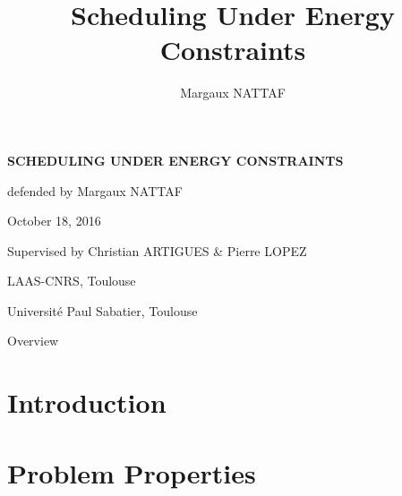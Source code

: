 \documentclass{beamer}
\title{Scheduling Under Energy Constraints}
\author{Margaux NATTAF}
\institute{LAAS-CNRS Toulouse

  Université Paul Sabatier Toulouse}
\begin{document}
{\canvasspecial
  \begin{frame}
    \vspace{1.5cm}
    \begin{flushleft}
      {\Large \bf \color{bleuLAAS}SCHEDULING UNDER ENERGY CONSTRAINTS}
      
      \vspace{0.3cm}
      \small \color{bleuLAAS!90} defended by Margaux NATTAF

      October 18, 2016
    \end{flushleft}
    \vspace{0.5cm}

    {\footnotesize  \color{bleuLAAS!80}
      Supervised by Christian ARTIGUES \& Pierre LOPEZ}

    \vspace{1.5cm}
    \begin{flushright} \color{bleuLAAS!70}
      \scriptsize LAAS-CNRS, Toulouse

      Université Paul Sabatier, Toulouse
    \end{flushright}
  \end{frame}}

\setcounter{framenumber}{0}


\setcounter{tocdepth}{1}
\begin{frame}{Overview}
  \tableofcontents[hideothersubsections,subsubsectionstyle={show/show/show/show}]
\end{frame}

\section{Introduction}




\setcounter{tocdepth}{2}
\section{Problem Properties}

\end{document}
